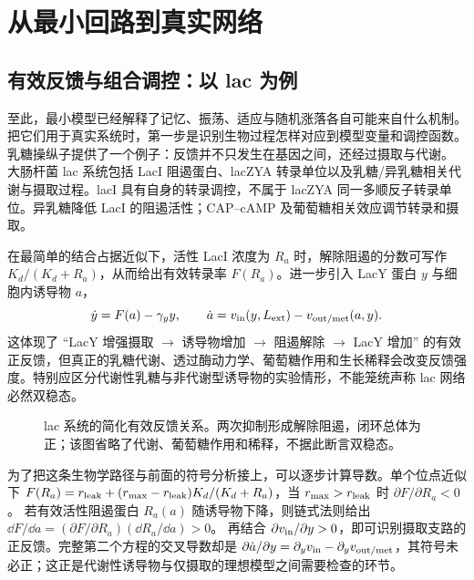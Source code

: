 \chapter{从最小回路到真实网络}
\section{有效反馈与组合调控：以 lac 为例}
至此，最小模型已经解释了记忆、振荡、适应与随机涨落各自可能来自什么机制。把它们用于真实系统时，第一步是识别生物过程怎样对应到模型变量和调控函数。乳糖操纵子提供了一个例子：反馈并不只发生在基因之间，还经过摄取与代谢。
大肠杆菌 lac 系统包括 LacI 阻遏蛋白、lacZYA 转录单位以及乳糖/异乳糖相关代谢与摄取过程。lacI 具有自身的转录调控，不属于 lacZYA 同一多顺反子转录单位。异乳糖降低 LacI 的阻遏活性；CAP--cAMP 及葡萄糖相关效应调节转录和摄取。

在最简单的结合占据近似下，活性 LacI 浓度为 $R_a$ 时，解除阻遏的分数可写作 $K_d/(K_d+R_a)$，从而给出有效转录率 $F(R_a)$。进一步引入 LacY 蛋白 $y$ 与细胞内诱导物 $a$，
\begin{equation}\dot y=F(a)-\gamma_y y,\qquad\dot a=v_{\rm in}(y,L_{\rm ext})-v_{\rm out/met}(a,y).\end{equation}
这体现了 ``LacY 增强摄取 $\to$ 诱导物增加 $\to$ 阻遏解除 $\to$ LacY 增加'' 的有效正反馈，但真正的乳糖代谢、透过酶动力学、葡萄糖作用和生长稀释会改变反馈强度。特别应区分代谢性乳糖与非代谢型诱导物的实验情形，不能笼统声称 lac 网络必然双稳态。

\begin{figure}[H]\centering
{}
\caption{lac 系统的简化有效反馈关系。两次抑制形成解除阻遏，闭环总体为正；该图省略了代谢、葡萄糖作用和稀释，不据此断言双稳态。}
\end{figure}

为了把这条生物学路径与前面的符号分析接上，可以逐步计算导数。单个位点近似下 $F(R_a)=r_{\rm leak}+(r_{\rm max}-r_{\rm leak})K_d/(K_d+R_a)$，当 $r_{\rm max}>r_{\rm leak}$ 时 $\partial F/\partial R_a<0$。
若有效活性阻遏蛋白 $R_a(a)$ 随诱导物下降，则链式法则给出 $\dd F/\dd a=(\partial F/\partial R_a)(\dd R_a/\dd a)>0$。
再结合 $\partial v_{\rm in}/\partial y>0$，即可识别摄取支路的正反馈。完整第二个方程的交叉导数却是
$\partial\dot a/\partial y=\partial_yv_{\rm in}-\partial_yv_{\rm out/met}$，其符号未必正；这正是代谢性诱导物与仅摄取的理想模型之间需要检查的环节。

